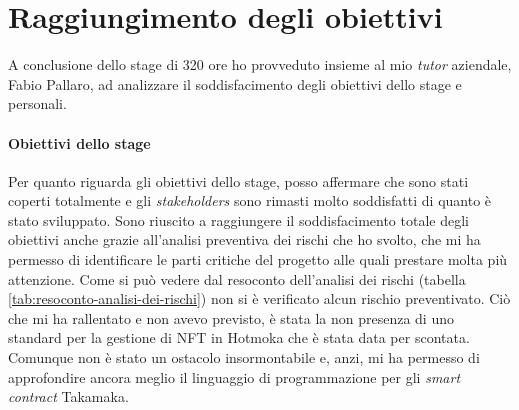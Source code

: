 
\section{Raggiungimento degli obiettivi}
A conclusione dello stage di 320 ore ho provveduto insieme al mio \textit{tutor} aziendale, Fabio Pallaro, ad analizzare il soddisfacimento degli obiettivi dello stage e personali.

\paragraph{Obiettivi dello stage}
Per quanto riguarda gli obiettivi dello stage, posso affermare che sono stati coperti totalmente e gli \textit{stakeholders} sono rimasti molto soddisfatti di quanto è stato sviluppato. 
Sono riuscito a raggiungere il soddisfacimento totale degli obiettivi anche grazie all'analisi preventiva dei rischi che ho svolto, che mi ha permesso di identificare le parti critiche del progetto alle quali prestare molta più attenzione. 
Come si può vedere dal resoconto dell'analisi dei rischi (tabella \ref{tab:resoconto-analisi-dei-rischi}) non si è verificato alcun rischio preventivato. 
Ciò che mi ha rallentato e non avevo previsto, è stata la non presenza di uno standard per la gestione di NFT in Hotmoka che è stata data per scontata. Comunque non è stato un ostacolo insormontabile e, anzi, mi ha permesso di approfondire ancora meglio il linguaggio di programmazione per gli \textit{smart contract} Takamaka.

